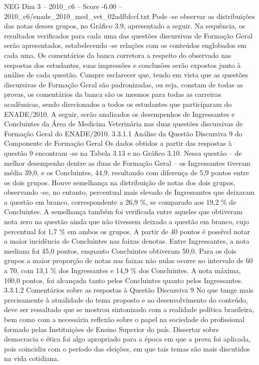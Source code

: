 \begin{textsample}{NEG Dim 3 – 2010\_c6 – Score -6.00 – 2010\_c6/enade\_2010\_med\_vet\_02adfbfccf.txt}
Pode -se observar as distribuições das notas desses grupos, no Gráfico 3.9, apresentado a seguir.
Na sequência, os resultados verificados para cada uma das questões discursivas de Formação Geral serão apresentados, estabelecendo -se relações com os conteúdos englobados em cada uma.
Os comentários da banca corretora a respeito do observado nas respostas dos estudantes, suas impressões e conclusões serão expostos junto à análise de cada questão.
Cumpre esclarecer que, tendo em vista que as questões discursivas de Formação Geral são padronizadas, ou seja, constam de todas as provas, os comentários da banca são os mesmos para todas as carreiras acadêmicas, sendo direcionados a todos os estudantes que participaram do ENADE/2010.
A seguir, serão analisados os desempenhos de Ingressantes e Concluintes da Área de Medicina Veterinária nas duas questões discursivas de Formação Geral do ENADE/2010. 3.3.1.1 Análise da Questão Discursiva 9 do Componente de Formação Geral Os dados obtidos a partir das respostas à questão 9 encontram -se na Tabela 3.13 e no Gráfico 3.10.
Nessa questão – de melhor desempenho dentre as duas de Formação Geral – os Ingressantes tiveram média 39,0, e os Concluintes, 44,9, resultando com diferença de 5,9 pontos entre os dois grupos.
Houve semelhança na distribuição de notas dos dois grupos, observando -se, no entanto, percentual mais elevado de Ingressantes que deixaram a questão em branco, correspondente a 26,9 \%, se comparado aos 19,2 \% de Concluintes.
A semelhança também foi verificada entre aqueles que obtiveram nota zero na questão ainda que não tivessem deixado a questão em branco, cujo percentual foi 1,7 \% em ambos os grupos.
A partir de 40 pontos é possível notar a maior incidência de Concluintes nas faixas denotas.
Entre Ingressantes, a nota mediana foi 45,0 pontos, enquanto Concluintes obtiveram 50,0.
Para os dois grupos a maior proporção de notas nas faixas não nulas ocorre no intervalo de 60 a 70, com 13,1 \% dos Ingressantes e 14,9 \% dos Concluintes.
A nota máxima, 100,0 pontos, foi alcançada tanto pelos Concluintes quanto pelos Ingressantes. 3.3.1.2 Comentários sobre as respostas à Questão Discursiva 9 No que tange mais precisamente à atualidade do tema proposto e ao desenvolvimento do conteúdo, deve ser ressaltado que se mostrou sintonizado com a realidade política brasileira, bem como com a necessária reflexão sobre o papel na sociedade do profissional formado pelas Instituições de Ensino Superior do país.
Dissertar sobre democracia e ética foi algo apropriado para a época em que a prova foi aplicada, pois coincidiu com o período das eleições, em que tais temas são mais discutidos na vida cotidiana.

\end{textsample}

